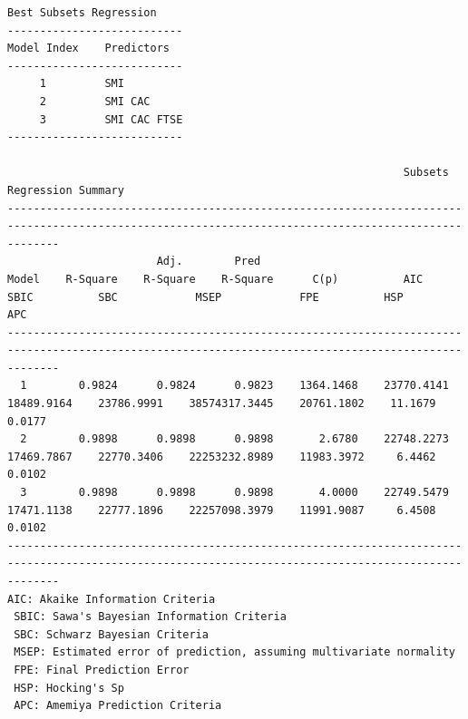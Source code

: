 \documentclass[a4paper, 11pt]{article}
\begin{document}
\begin{verbatim}
Best Subsets Regression  
---------------------------
Model Index    Predictors
---------------------------
     1         SMI          
     2         SMI CAC      
     3         SMI CAC FTSE 
---------------------------

                                                             Subsets Regression Summary                                                             
----------------------------------------------------------------------------------------------------------------------------------------------------
                       Adj.        Pred                                                                                                              
Model    R-Square    R-Square    R-Square      C(p)          AIC           SBIC          SBC            MSEP            FPE          HSP       APC  
----------------------------------------------------------------------------------------------------------------------------------------------------
  1        0.9824      0.9824      0.9823    1364.1468    23770.4141    18489.9164    23786.9991    38574317.3445    20761.1802    11.1679    0.0177 
  2        0.9898      0.9898      0.9898       2.6780    22748.2273    17469.7867    22770.3406    22253232.8989    11983.3972     6.4462    0.0102 
  3        0.9898      0.9898      0.9898       4.0000    22749.5479    17471.1138    22777.1896    22257098.3979    11991.9087     6.4508    0.0102 
----------------------------------------------------------------------------------------------------------------------------------------------------
AIC: Akaike Information Criteria 
 SBIC: Sawa's Bayesian Information Criteria 
 SBC: Schwarz Bayesian Criteria 
 MSEP: Estimated error of prediction, assuming multivariate normality 
 FPE: Final Prediction Error 
 HSP: Hocking's Sp 
 APC: Amemiya Prediction Criteria 
\end{verbatim}
\endgroup
\end{document}
